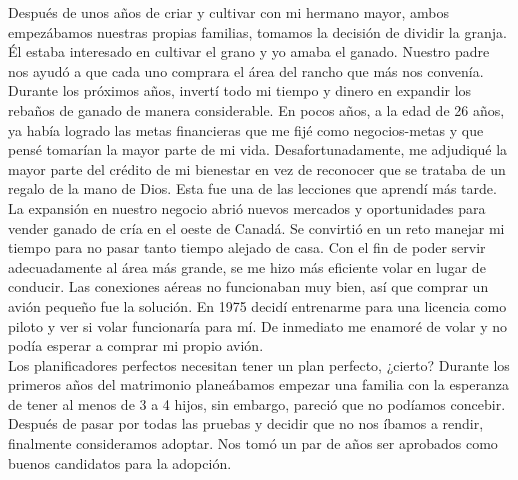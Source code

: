 \documentclass[twoside, 12pt]{book}
\begin{document}
Después de unos años de criar y cultivar con mi hermano mayor, ambos empezábamos nuestras propias familias, tomamos la decisión de dividir la granja. Él estaba interesado en cultivar el grano y yo amaba el ganado. Nuestro padre nos ayudó a que cada uno comprara el área del rancho que más nos convenía. Durante los próximos años, invertí todo mi tiempo y dinero en expandir los rebaños de ganado de manera considerable. En pocos años, a la edad de 26 años, ya había logrado las metas financieras que me fijé como negocios-metas y que pensé tomarían la mayor parte de mi vida. Desafortunadamente, me adjudiqué la mayor parte del crédito de mi bienestar en vez de reconocer que se trataba de un regalo de la mano de Dios. Esta fue una de las lecciones que aprendí más tarde.
La expansión en nuestro negocio abrió nuevos mercados y oportunidades para vender ganado de cría en el oeste de Canadá. Se convirtió en un reto manejar mi tiempo para no pasar tanto tiempo alejado de casa. Con el fin de poder servir adecuadamente al área más grande, se me hizo más eficiente volar en lugar de conducir. Las conexiones aéreas no funcionaban muy bien, así que comprar un avión pequeño fue la solución. En 1975 decidí entrenarme para una licencia como piloto y ver si volar funcionaría para mí. De inmediato me enamoré de volar y no podía esperar a comprar mi propio avión.\\
            
Los planificadores perfectos necesitan tener un plan perfecto, ¿cierto? Durante los primeros años del matrimonio planeábamos empezar una familia con la esperanza de tener al menos de 3 a 4 hijos, sin embargo, pareció que no podíamos concebir. Después de pasar por todas las pruebas y decidir que no nos íbamos a rendir, finalmente consideramos adoptar. Nos tomó un par de años ser aprobados como buenos candidatos para la adopción.\\
\end{document}
